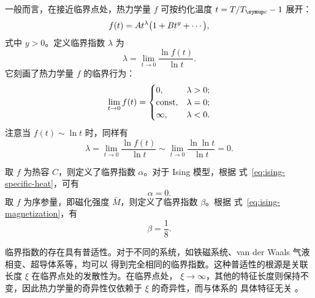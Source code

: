 一般而言，在接近临界点处，热力学量 $f$ 可按约化温度 $t=T/\Tc-1$ 展开：
\begin{equation}
  f(t) = A t^\lambda \qty\big(1 + B t^y + \cdots),
\end{equation}
式中 $y>0$。定义临界指数 $\lambda$ 为 \cite{surukeng}
\begin{equation}
  \lambda = \lim_{t \to 0} \frac{\ln f(t)}{\ln t}.
\end{equation}
它刻画了热力学量 $f$ 的临界行为：
\begin{equation}
  \lim_{t \to 0} f(t) =
  \begin{cases}
    0,      & \lambda > 0; \\
    \text{const}, & \lambda = 0; \\
    \infty, & \lambda < 0.
  \end{cases}
\end{equation}
注意当 $f(t) \sim \ln t$ 时，同样有
\begin{equation}
  \lambda =    \lim_{t \to 0} \frac{\ln f(t)}{\ln t}
          \sim \lim_{t \to 0} \frac{\ln \ln t}{\ln t} = 0.
\end{equation}

取 $f$ 为热容 $C$，则定义了临界指数 $\alpha$。对于 Ising 模型，根据
式~\eqref{eq:ising-specific-heat}，可有
\begin{equation}
  \alpha = 0.
\end{equation}
取 $f$ 为序参量，即磁化强度 $\bar{M}$，则定义了临界指数 $\beta$。根据
式~\eqref{eq:ising-magnetization}，有
\begin{equation}
  \beta = \frac{1}{8}.
\end{equation}

临界指数的存在具有普适性。对于不同的系统，如铁磁系统、van der Waals 气液相变、超导体系等，均可以
得到完全相同的临界指数。这种普适性的根源是关联长度 $\xi$ 在临界点处的发散性为。在临界点处，
$\xi\to\infty$，其他的特征长度则保持不变，因此热力学量的奇异性仅依赖于 $\xi$ 的奇异性，而与体系的
具体特征无关 \cite{linzonghan,surukeng}。

